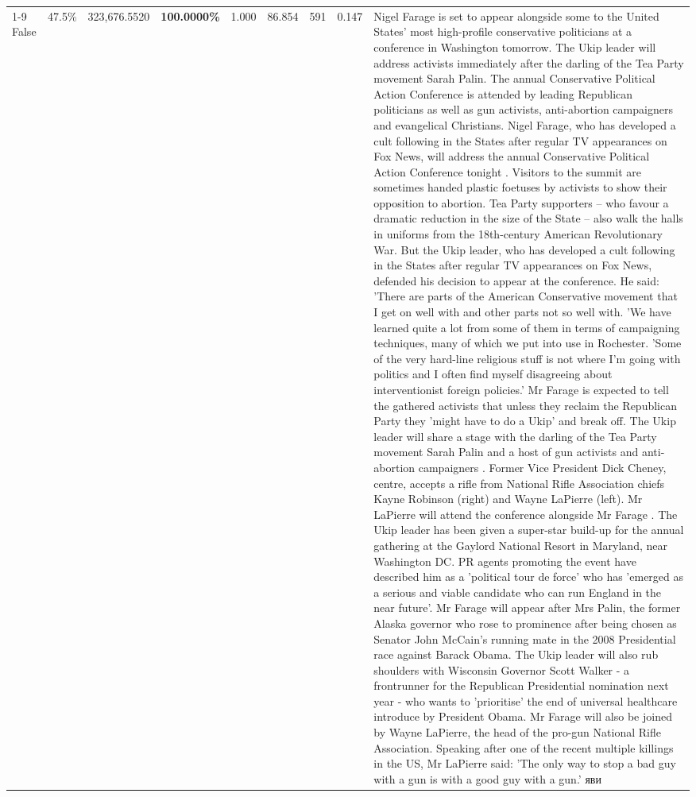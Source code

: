 \begin{table}[H]
\begin{tabular}{lllrlllll}
\cline{1-9} \cline{2-9}
False & 47.5\% & 323,676.5520 & \bfseries \color{red} 100.0000\% & 1.000 & 86.854 & 591 & 0.147 & Nigel Farage is set to appear alongside some to the United States' most high-profile conservative politicians at a conference in Washington tomorrow. The Ukip leader will address activists immediately after the darling of the Tea Party movement Sarah Palin. The annual Conservative Political Action Conference is attended by leading Republican politicians as well as gun activists, anti-abortion campaigners and evangelical Christians. Nigel Farage, who has developed a cult following in the States after regular TV appearances on Fox News, will address the annual Conservative Political Action Conference tonight . Visitors to the summit are sometimes handed plastic foetuses by activists to show their opposition to abortion. Tea Party supporters – who favour a dramatic reduction in the size of the State – also walk the halls in uniforms from the 18th-century American Revolutionary War. But the Ukip leader, who has developed a cult following in the States after regular TV appearances on Fox News, defended his decision to appear at the conference. He said: 'There are parts of the American Conservative movement that I get on well with and other parts not so well with. 'We have learned quite a lot from some of them in terms of campaigning techniques, many of which we put into use in Rochester. 'Some of the very hard-line religious stuff is not where I'm going with politics and I often find myself disagreeing about interventionist foreign policies.' Mr Farage is expected to tell the gathered activists that unless they reclaim the Republican Party they 'might have to do a Ukip' and break off. The Ukip leader will share a stage with the darling of the Tea Party movement Sarah Palin and a host of gun activists and anti-abortion campaigners . Former Vice President Dick Cheney, centre, accepts a rifle from National Rifle Association chiefs Kayne Robinson (right) and Wayne LaPierre (left). Mr LaPierre will attend the conference alongside Mr Farage . The Ukip leader has been given a super-star build-up for the annual gathering at the Gaylord National Resort in Maryland, near Washington DC. PR agents promoting the event have described him as a 'political tour de force' who has 'emerged as a serious and viable candidate who can run England in the near future'. Mr Farage will appear after Mrs Palin, the former Alaska governor who rose to prominence after being chosen as Senator John McCain's running mate in the 2008 Presidential race against Barack Obama. The Ukip leader will also rub shoulders with Wisconsin Governor Scott Walker - a frontrunner for the Republican Presidential nomination next year - who wants to 'prioritise' the end of universal healthcare introduce by President Obama. Mr Farage will also be joined by Wayne LaPierre, the head of the pro-gun National Rifle Association. Speaking after one of the recent multiple killings in the US, Mr LaPierre said: 'The only way to stop a bad guy with a gun is with a good guy with a gun.' яви \\

\end{tabular}
\end{table}
